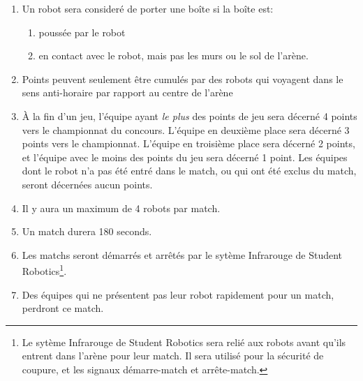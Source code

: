 \begin{enumerate}
\item Un robot sera consideré de porter une boîte si la boîte est:
  \begin{enumerate}
  \item poussée par le robot
  \item en contact avec le robot, mais pas les murs ou le sol de l'arène.
  \end{enumerate}

\item Points peuvent seulement être cumulés par des robots qui voyagent dans le sens anti-horaire par rapport au centre de l'arène

\item À la fin d'un jeu, l'équipe ayant \emph{le plus} des points de jeu sera décerné 4 points vers le championnat du concours.
 L'équipe en deuxième place sera décerné 3 points vers le championnat.
 L'équipe en troisième place sera décerné 2 points, et l'équipe avec le moins des points du jeu sera décerné 1 point.
 Les équipes dont le robot n'a pas été entré dans le match, ou qui ont été exclus du match, seront décernées aucun points.

\item Il y aura un maximum de 4 robots par match.
\item Un match durera 180 seconds.
\item Les matchs seront démarrés et arrêtés par le sytème Infrarouge de Student Robotics\footnote{Le sytème Infrarouge de Student Robotics sera relié aux robots avant qu'ils entrent dans l'arène pour leur match. Il sera utilisé pour la sécurité de coupure, et les signaux démarre-match et arrête-match.}.
\item Des équipes qui ne présentent pas leur robot rapidement pour un match, perdront ce match.
\end{enumerate}
